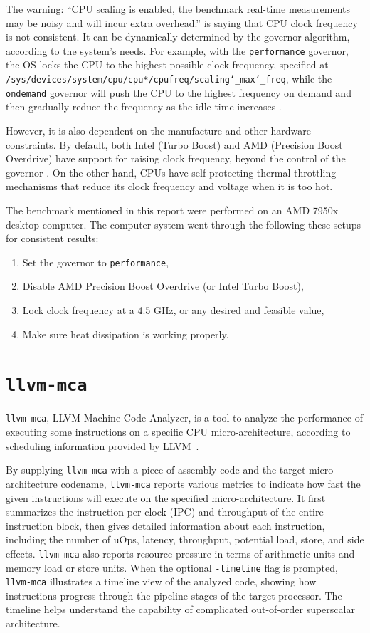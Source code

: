 \documentclass[logo,bsc,singlespacing,parskip]{infthesis}
\newcommand{\mca}{\texttt{llvm-mca}}
\newenvironment{compactlist}
{ \begin{enumerate}
    \setlength{\itemsep}{0pt}
    \setlength{\parskip}{0pt}
    \setlength{\parsep}{0pt}     
}
{ \end{enumerate} }
\begin{document}
The warning: ``CPU scaling is enabled, the benchmark real-time measurements may
be noisy and will incur extra overhead.'' is saying that CPU clock frequency is
not consistent. It can be dynamically determined by the governor algorithm,
according to the system's needs. For example, with the \texttt{performance}
governor, the OS locks the CPU to the highest possible clock frequency,
specified at
\texttt{/sys/devices/system/cpu/cpu*/cpufreq/scaling\char`_max\char`_freq},
while the \texttt{ondemand} governor will push the CPU to the highest frequency
on demand and then gradually reduce the frequency as the idle time increases
\cite{archLinuxFreqScal}.

However, it is also dependent on the manufacture and other hardware constraints.
By default, both Intel (Turbo Boost) and AMD (Precision Boost Overdrive) have
support for raising clock frequency, beyond the control of the governor
\cite{GoogleBenchReduceVariance}. On the other hand, CPUs have self-protecting
thermal throttling mechanisms that reduce its clock frequency and voltage when
it is too hot. 

The benchmark mentioned in this report were performed on an AMD 7950x desktop
computer. The computer system went through the following these setups for
consistent results:
\begin{compactlist}
    \item Set the governor to \texttt{performance}, 
    \item Disable AMD Precision Boost Overdrive (or Intel Turbo Boost), 
    \item Lock clock frequency at a 4.5 GHz, or any desired and feasible value,
    \item Make sure heat dissipation is working properly.
\end{compactlist}



\section{\mca{}}

\mca{}, LLVM Machine Code Analyzer, is a tool to analyze the performance of
executing some instructions on a specific CPU micro-architecture, according to
scheduling information provided by LLVM~\cite{llvm-mca}. 

By supplying \mca{} with a piece of assembly code and the target
micro-architecture codename, \mca{} reports various metrics to indicate how fast
the given instructions will execute on the specified micro-architecture. It
first summarizes the instruction per clock (IPC) and throughput of the entire
instruction block, then gives detailed information about each instruction,
including the number of uOps, latency, throughput, potential load, store, and side
effects. \mca{} also reports resource pressure in terms of arithmetic units and
memory load or store units. When the optional \texttt{-timeline} flag is
prompted, \mca{} illustrates a timeline view of the analyzed code, showing how
instructions progress through the pipeline stages of the target processor. The
timeline helps understand the capability of complicated out-of-order superscalar
architecture. 
\end{document}
